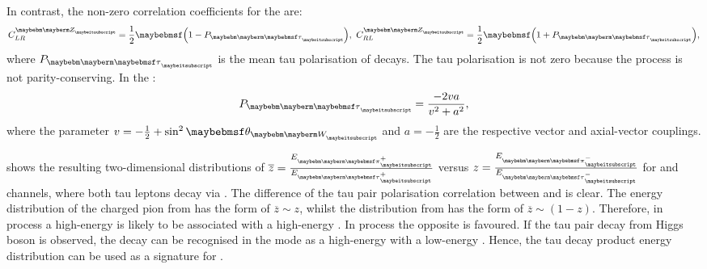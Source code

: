 In contrast, the non-zero correlation coefficients  for the  \ZToTauTau are:
\begin{equation}
C^{\PZ}_{LR} = \frac{1}{2}\parenths{1 - P_{\Ptau}},\ C^{\PZ}_{RL} = \frac{1}{2}\parenths{1 + P_{\Ptau}},
\end{equation}
where $P_{\Ptau}$ is the mean tau polarisation of \PZ decays. The tau polarisation is not zero because the process \ZToTauTau  is not parity-conserving. In the \SM:
\begin{equation}
P_{\Ptau} = \frac{-2va}{v^2 + a^2},
\end{equation}
where the parameter $v= -\frac{1}{2} + \sin^2{\theta_{\PW}}$ and  $a= -\frac{1}{2}$ are the respective vector and axial-vector \ZTauTau couplings.


 shows the resulting two-dimensional distributions of  $\overline{z} = \frac{E_{\Ppiplus}}{E_{\APtauon}}$ versus  $z = \frac{E_{\Ppiminus}}{E_{\Ptauon}}$ for \ZToTauTau and \HiggsToTauTau channels, where both tau leptons decay via \tauToPionBoth. The difference of the tau pair polarisation correlation between \PZ and \PHiggs  is clear. The energy distribution of the charged pion from \ZToTauTau has the form of $\overline{z}  \sim z$, whilst the distribution from  \HiggsToTauTau has the form of $\overline{z}  \sim (1-z)$. Therefore, in \ZToTauTau process a high-energy \Pgppm  is likely to be associated with a high-energy \Pgpmp. In \HiggsToTauTau process the opposite is favoured. If the tau pair decay from Higgs boson is observed, the decay can be recognised in the \tauToPionBoth mode as a high-energy \Pgppm with a low-energy \Pgpmp. Hence, the tau decay product energy distribution can be used as a signature for \HiggsToTauTau.


